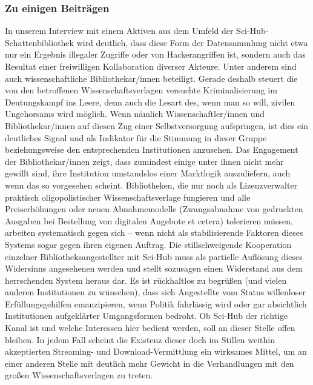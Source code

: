 \documentclass[a4paper,
fontsize=11pt,
oneside,
numbers=noperiodatend,
parskip=half-,
bibliography=totoc,
final
]{scrartcl}
\begin{document}
\hypertarget{zu-einigen-beitruxe4gen}{%
\subsubsection{Zu einigen Beiträgen}\label{zu-einigen-beitruxe4gen}}

In unserem Interview mit einem Aktiven aus dem Umfeld der
Sci-Hub-Schattenbibliothek wird deutlich, dass diese Form der
Datensammlung nicht etwa nur ein Ergebnis illegaler Zugriffe oder von
Hackerangriffen ist, sondern auch das Resultat einer freiwilligen
Kollaboration diverser Akteure. Unter anderem sind auch
wissenschaftliche Bibliothekar/innen beteiligt. Gerade deshalb steuert
die von den betroffenen Wissenschaftsverlagen versuchte Kriminalisierung
im Deutungskampf ins Leere, denn auch die Lesart des, wenn man so will,
zivilen Ungehorsams wird möglich. Wenn nämlich Wissenschaftler/innen und
Bibliothekar/innen auf diesen Zug einer Selbstversorgung aufspringen,
ist dies ein deutliches Signal und als Indikator für die Stimmung in
dieser Gruppe beziehungsweise den entsprechenden Institutionen
anzusehen. Das Engagement der Bibliothekar/innen zeigt, dass zumindest
einige unter ihnen nicht mehr gewillt sind, ihre Institution umstandslos
einer Marktlogik auszuliefern, auch wenn das so vorgesehen scheint.
Bibliotheken, die nur noch als Lizenzverwalter praktisch
oligopolistischer Wissenschaftsverlage fungieren und alle
Preiserhöhungen oder neuen Abnahmemodelle (Zwangsabnahme von gedruckten
Ausgaben bei Bestellung von digitalen Angebote et cetera) tolerieren
müssen, arbeiten systematisch gegen sich -- wenn nicht als
stabilisierende Faktoren dieses Systems sogar gegen ihren eigenen
Auftrag. Die stillschweigende Kooperation einzelner
Bibliotheksangestellter mit Sci-Hub muss als partielle Auflösung dieses
Widersinns angesehenen werden und stellt sozusagen einen Widerstand aus
dem herrschenden System heraus dar. Es ist rückhaltlos zu begrüßen (und
vielen anderen Institutionen zu wünschen), dass sich Angestellte vom
Status willenloser Erfüllungsgehilfen emanzipieren, wenn Politik
fahrlässig wird oder gar absichtlich Institutionen aufgeklärter
Umgangsformen bedroht. Ob Sci-Hub der richtige Kanal ist und welche
Interessen hier bedient werden, soll an dieser Stelle offen bleiben. In
jedem Fall scheint die Existenz dieser doch im Stillen weithin
akzeptierten Streaming- und Download-Vermittlung ein wirksames Mittel,
um an einer anderen Stelle mit deutlich mehr Gewicht in die
Verhandlungen mit den großen Wissenschaftsverlagen zu treten.
\end{document}
